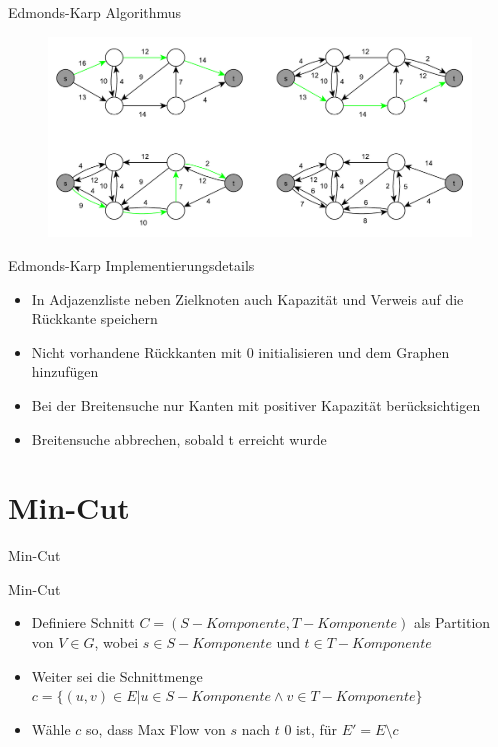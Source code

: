 \documentclass[18pt]{beamer}
\begin{document}
\begin{frame}{Edmonds-Karp Algorithmus}
\begin{figure}
	\includegraphics[width = \textwidth]{img/Jakob_Edmond.pdf}
\end{figure}
\end{frame}

\begin{frame}{Edmonds-Karp Implementierungsdetails}
\begin{itemize}
	\item In Adjazenzliste neben Zielknoten auch Kapazit\"at und Verweis auf die R\"uckkante speichern
	\item Nicht vorhandene R\"uckkanten mit 0 initialisieren und dem Graphen hinzuf\"ugen
	\item Bei der Breitensuche nur Kanten mit positiver Kapazit\"at ber\"ucksichtigen
	\item Breitensuche abbrechen, sobald t erreicht wurde
\end{itemize}
\end{frame}


\section{Min-Cut}
\begin{frame}{Min-Cut}
\begin{block}{Min-Cut}

\begin{itemize}
\item Definiere Schnitt \(C = (S-Komponente, T-Komponente)\) als Partition von \(V \in G \), wobei \(s \in S-Komponente\) und \(t \in T-Komponente\) 
\item Weiter sei die Schnittmenge \(c = \{(u, v) \in E | u \in S-Komponente \land v \in T-Komponente\}\)
\item W\"ahle \(c\) so, dass Max Flow von \(s\) nach \(t\) 0 ist, f\"ur \(E'=E\setminus c\) 
\end{itemize}
\end{block}
\end{frame}
\end{document}
